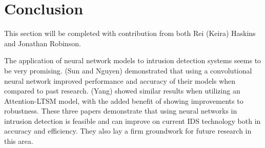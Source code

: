 \section{Conclusion}
This section will be completed with contribution from both Rei (Keira) Haskins and Jonathan Robinson.

The application of neural network models to intrusion detection systems seems to be very promising. (Sun and Nguyen) demonstrated that using a convolutional neural
network improved performance and accuracy of their models when compared to past research. (Yang) showed similar results when utilizing an Attention-LTSM model, with 
the added benefit of showing improvements to robustness. These three papers demonstrate that using neural networks in intrusion detection is feasible and can 
improve on current IDS technology both in accuracy and efficiency. They also lay a firm groundwork for future research in this area. 
